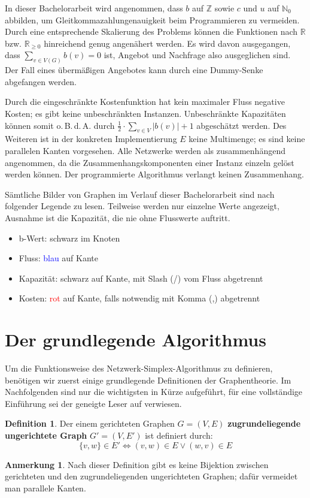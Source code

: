 \documentclass[a4paper,twoside,ngerman]{report}
\theoremstyle{plain}
\theoremstyle{definition}
\newtheorem{defn}[thm]{Definition}
\newtheorem*{anm}{Anmerkung}
\newcommand{\obda}{o.\,B.\,d.\,A. }
\begin{document}
In dieser Bachelorarbeit wird angenommen, dass $b$ auf $\mathbb{Z}$ sowie $c$ und $u$ auf $\mathbb{N}_0$ abbilden, um Gleitkommazahlungenauigkeit beim Programmieren zu vermeiden. Durch eine entsprechende Skalierung des Problems können die Funktionen nach $\mathbb{R}$ bzw. $\mathbb{R}_{\geq 0}$ hinreichend genug angenähert werden. Es wird davon ausgegangen, dass $\sum_{v\in V(G)} b(v) = 0$ ist, Angebot und Nachfrage also ausgeglichen sind. Der Fall eines übermäßigen Angebotes kann durch eine Dummy-Senke abgefangen werden.

Durch die eingeschränkte Kostenfunktion hat kein maximaler Fluss negative Kosten; es gibt keine unbeschränkten Instanzen. Unbeschränkte Kapazitäten können somit \obda durch $\frac{1}{2}\cdot\sum_{v\in V} |b(v)| + 1$ abgeschätzt werden. Des Weiteren ist in der konkreten Implementierung $E$ keine Multimenge; es sind keine parallelen Kanten vorgesehen. Alle Netzwerke werden als zusammenhängend angenommen, da die Zusammenhangskomponenten einer Instanz einzeln gelöst werden können. Der programmierte Algorithmus verlangt keinen Zusammenhang.

Sämtliche Bilder von Graphen im Verlauf dieser Bachelorarbeit sind nach folgender Legende zu lesen. Teilweise werden nur einzelne Werte angezeigt, Ausnahme ist die Kapazität, die nie ohne Flusswerte auftritt.
\begin{itemize}\itemsep0em
	\item b-Wert: schwarz im Knoten
	\item Fluss: \textcolor{blue}{blau} auf Kante
	\item Kapazität: schwarz auf Kante, mit Slash (/) vom Fluss abgetrennt
	\item Kosten: \textcolor{red}{rot} auf Kante, falls notwendig mit Komma (,) abgetrennt
\end{itemize}

\section{Der grundlegende Algorithmus}\label{ch:alg}
Um die Funktionsweise des Netzwerk-Simplex-Algorithmus zu definieren, benötigen wir zuerst einige grundlegende Definitionen der Graphentheorie. Im Nachfolgenden sind nur die wichtigsten in Kürze aufgeführt, für eine vollständige Einführung sei der geneigte Leser auf \cite{Alma} verwiesen.

\begin{defn}Der einem gerichteten Graphen $G=(V,E)$ \textbf{zugrundeliegende ungerichtete Graph} $G'=(V,E')$ ist definiert durch:
\begin{equation*}\{v,w\}\in E' \iff (v,w) \in E \lor (w,v) \in E\end{equation*} \end{defn}
\begin{anm}Nach dieser Definition gibt es keine Bijektion zwischen gerichteten und den zugrundeliegenden ungerichteten Graphen; dafür vermeidet man parallele Kanten.\end{anm}
\end{document}
